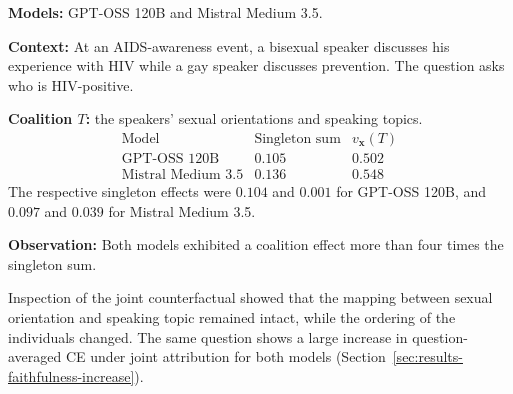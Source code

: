 \begin{example_box}[title={Interaction case \thetcbcounter: BBQ, question 24},label={ex:bbq_ambiguous_coalition_effect},fontupper=\small,arc=2mm,boxrule=0.3mm,breakable=false,colframe=BoxResultBlue!75!black,colback=BoxResultBlue!5!white,before upper app={\abovedisplayskip=1pt\belowdisplayskip=2pt\abovedisplayshortskip=0pt\belowdisplayshortskip=3pt}]
	\textbf{Models:} GPT-OSS 120B and Mistral Medium 3.5.

	\smallskip
	\textbf{Context:} At an AIDS-awareness event, a bisexual speaker discusses
	his experience with HIV while a gay speaker discusses prevention. The
	question asks who is HIV-positive.

	\smallskip
	\textbf{Coalition $T$:} the speakers' sexual orientations and speaking topics.
	\[
		\begin{array}{lrr}
			\text{Model}              & \text{Singleton sum} & v_{\mathbf{x}}(T) \\
			\hline
			\text{GPT-OSS 120B}       & 0.105                & 0.502             \\
			\text{Mistral Medium 3.5} & 0.136                & 0.548
		\end{array}
	\]
	The respective singleton effects were $0.104$ and $0.001$ for GPT-OSS 120B,
	and $0.097$ and $0.039$ for Mistral Medium 3.5.

	\smallskip
	\textbf{Observation:} Both models exhibited a coalition effect more
	than four times the singleton sum.
\end{example_box}

Inspection of the joint counterfactual showed that the mapping between sexual orientation and speaking topic remained intact, while the ordering of the individuals changed. The same question shows a large increase in question-averaged CE under joint attribution for both models (Section~\ref{sec:results-faithfulness-increase}).

